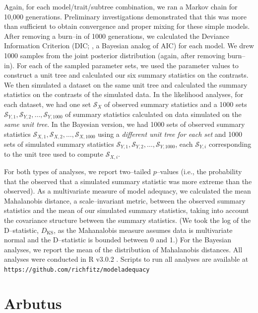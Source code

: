 \documentclass[a4paper,12pt]{article}
\begin{document}
Again, for each model/trait/subtree combination, we ran a Markov chain for 10,000 generations. Preliminary investigations demonstrated that this was more than sufficient to obtain convergence and proper mixing for these simple models. After removing a burn--in of 1000 generations, we calculated the Deviance Information Criterion (DIC; \citep{dic}, a Bayesian analog of AIC) for each model. We drew 1000 samples from the joint posterior distribution (again, after removing burn--in). For each of the sampled parameter sets, we used the parameter values to construct a unit tree and calculated our six summary statistics on the contrasts. We then simulated a dataset on the same unit tree and calculated the summary statistics on the contrasts of the simulated data. In the likelihood analyses, for each dataset, we had one set $\mathcal{S}_X$ of observed summary statistics and a 1000 sets $\mathcal{S}_{Y,1}, \mathcal{S}_{Y,2}, \ldots, \mathcal{S}_{Y,1000}$ of summary statistics calculated on data simulated on the \emph{same unit tree}. In the Bayesian version, we had 1000 sets of observed summary statistics $\mathcal{S}_{X,1}, \mathcal{S}_{X,2}, \ldots, \mathcal{S}_{X,1000}$ using a \emph{different unit tree for each set} and 1000 sets of simulated summary statistics $\mathcal{S}_{Y,1}, \mathcal{S}_{Y,2}, \ldots, \mathcal{S}_{Y,1000}$, each $\mathcal{S}_{Y,i}$ corresponding to the unit tree used to compute $\mathcal{S}_{X,i}$.
 
For both types of analyses, we report two--tailed $p$--values (i.e., the probability that the observed that a simulated summary statistic was more extreme than the observed). As a multivariate measure of model adequacy, we calculated the mean Mahalanobis distance, a scale--invariant metric, between the observed summary statistics and the mean of our simulated summary statistics, taking into account the covariance structure between the summary statistics. (We took the log of the  D--statistic, $D_{\text{KS}}$, as the Mahanalobis measure assumes data is multivariate normal and the D--statistic is bounded between 0 and 1.) For the Bayesian analyses, we report the mean of the distribution of Mahalanobis distances. All analyses were conducted in R v3.0.2 \citep{R}. Scripts to run all analyses are available at \texttt{https://github.com/richfitz/modeladequacy}

\section{Arbutus}
\end{document}
